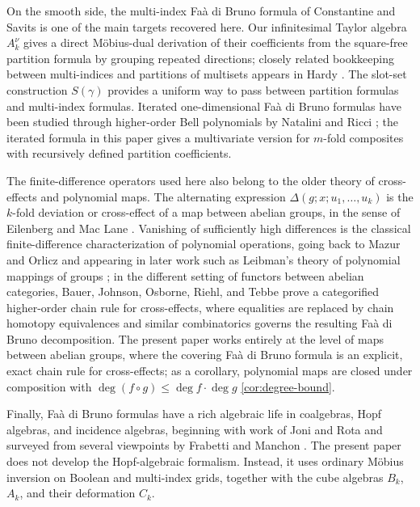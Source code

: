 \documentclass[10pt,a4paper]{article}
\theoremstyle{plain}
\theoremstyle{definition}
\newcommand{\1}{\mathbb{1}} %
\begin{document}
On the smooth side, the multi-index Faà di Bruno formula of Constantine
and Savits \citep{CS1996} is one of the main targets recovered here. Our
infinitesimal Taylor algebra \(A_k^\nu\) gives a direct Möbius-dual
derivation of their coefficients from the square-free partition formula
by grouping repeated directions; closely related bookkeeping between
multi-indices and partitions of multisets appears in Hardy
\citep{Hardy2006}. The slot-set construction \(S(\gamma)\) provides a
uniform way to pass between partition formulas and multi-index formulas.
Iterated one-dimensional Faà di Bruno formulas have been studied through
higher-order Bell polynomials by Natalini and Ricci \citep{NR2004}; the
iterated formula in this paper gives a multivariate version for
\(m\)-fold composites with recursively defined partition coefficients.

The finite-difference operators used here also belong to the older
theory of cross-effects and polynomial maps. The alternating expression
\(\Delta(g; x; u_1, \dots, u_k)\) is the \(k\)-fold deviation or
cross-effect of a map between abelian groups, in the sense of Eilenberg
and Mac Lane \citep{EML1954}. Vanishing of sufficiently high differences
is the classical finite-difference characterization of polynomial
operations, going back to Mazur and Orlicz \citep{MO1934} and appearing
in later work such as Leibman's theory of polynomial mappings of groups
\citep{Leibman2002}; in the different setting of functors between
abelian categories, Bauer, Johnson, Osborne, Riehl, and Tebbe
\citep{BJORT2018} prove a categorified higher-order chain rule for
cross-effects, where equalities are replaced by chain homotopy
equivalences and similar combinatorics governs the resulting Faà di
Bruno decomposition. The present paper works entirely at the level of
maps between abelian groups, where the covering Faà di Bruno formula is
an explicit, exact chain rule for cross-effects; as a corollary,
polynomial maps are closed under composition with
\(\deg(f \circ g) \leq \deg f \cdot \deg g\) \ref{cor:degree-bound}.

Finally, Faà di Bruno formulas have a rich algebraic life in coalgebras,
Hopf algebras, and incidence algebras, beginning with work of Joni and
Rota \citep{JR1979} and surveyed from several viewpoints by Frabetti and
Manchon \citep{FM2014}. The present paper does not develop the
Hopf-algebraic formalism. Instead, it uses ordinary Möbius inversion on
Boolean and multi-index grids, together with the cube algebras \(B_k\),
\(A_k\), and their deformation \(C_k\).
\end{document}
